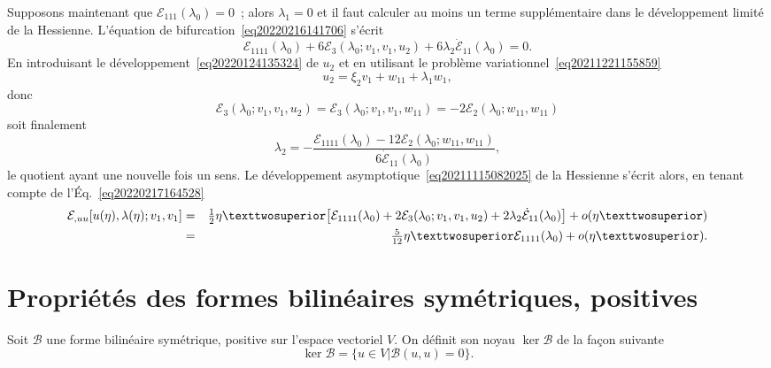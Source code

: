\documentclass[12pt, final]{amsart}
\begin{document}
Supposons maintenant que \(\mathcal E_{111}(\lambda _0)=0\)~; alors \(\lambda _1=0\) et il faut calculer au
moins un terme supplémentaire dans le développement limité de la
Hessienne. L'équation de bifurcation~\eqref{eq20220216141706} s'écrit
\begin{equation}
  \label{eq20220217164528}
  \mathcal E_{1111}(\lambda _0)+6\mathcal E_3(\lambda _0; v_1, v_1, u_2)+6\lambda _2\dot{\mathcal E}_{11}(\lambda _0)=0.
\end{equation}
En introduisant le développement~\eqref{eq20220124135324} de \(u_2\) et en
utilisant le problème variationnel~\eqref{eq20211221155859}
\begin{equation}
  u_2=\xi _2v_1+w_{11}+\lambda _1w_1,
\end{equation}
donc
\begin{equation}
  \mathcal E_3(\lambda _0;v_1, v_1, u_2)=\mathcal E_3(\lambda _0;v_1, v_1, w_{11})=-2\mathcal E_2(\lambda _0;w_{11}, w_{11})
\end{equation}
soit finalement
\begin{equation*}
  \lambda _2=-\frac{\mathcal E_{1111}(\lambda _0)-12\mathcal E_2(\lambda _0;w_{11}, w_{11})}{6\dot{\mathcal E}_{11}(\lambda _0)},
\end{equation*}
le quotient ayant une nouvelle fois un sens. Le développement
asymptotique~\eqref{eq20211115082025} de la Hessienne s'écrit alors, en tenant
compte de l'Éq.~\eqref{eq20220217164528}
\begin{eqnarray}
  \notag
  \mathcal E_{,uu}[u(\eta ), \lambda (\eta ); v_1, v_1]
  &=&\tfrac12\eta ²\bigl[\mathcal E_{1111}(\lambda _0)+2\mathcal E_3(\lambda _0; v_1, v_1, u_2)+2\lambda _2\dot{\mathcal E}_{11}(\lambda _0)\bigr]+o(\eta ²)\\
  &=&\tfrac5{12}\eta ²\mathcal E_{1111}(\lambda _0)+o(\eta ²).
\end{eqnarray}

\appendix

\section{Propriétés des formes bilinéaires symétriques, positives}

Soit \(\mathcal B\) une forme bilinéaire symétrique, positive sur l'espace vectoriel
\(V\). On définit son noyau \(\ker\mathcal B\) de la façon suivante
\begin{equation}
  \ker\mathcal B=\{u\in V|\mathcal B(u, u)=0\}.
\end{equation}
\end{document}
